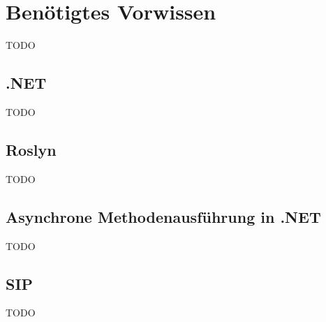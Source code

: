 \section{Benötigtes Vorwissen}
TODO

\subsection{.NET}
TODO 
 
\subsection{Roslyn}
TODO

\subsection{Asynchrone Methodenausführung in .NET}
TODO

\subsection{SIP}
TODO